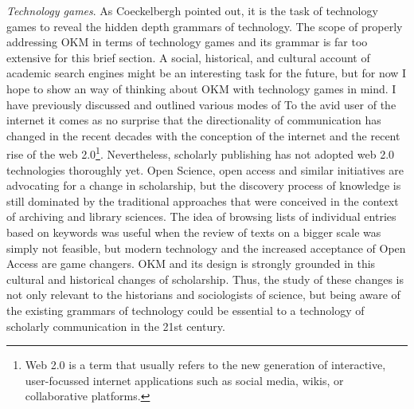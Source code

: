 \textit{Technology games}. As Coeckelbergh pointed out, it is the task of technology games to reveal the hidden depth grammars of technology. The scope of properly addressing OKM in terms of technology games and its grammar is far too extensive for this brief section. A social, historical, and cultural account of academic search engines might be an interesting task for the future, but for now I hope to show an way of thinking about OKM with technology games in mind. I have previously discussed and outlined various modes of  To the avid user of the internet it comes as no surprise that the directionality of communication has changed in the recent decades with the conception of the internet and the recent rise of the web 2.0\footnote{Web 2.0 is a term that usually refers to the new generation of interactive, user-focussed internet applications such as social media, wikis, or collaborative platforms.}. Nevertheless, scholarly publishing has not adopted web 2.0 technologies thoroughly yet. Open Science, open access and similar initiatives are advocating for a change in scholarship, but the discovery process of knowledge is still dominated by the traditional approaches that were conceived in the context of archiving and library sciences. The idea of browsing lists of individual entries based on keywords was useful when the review of texts on a bigger scale was simply not feasible, but modern technology and the increased acceptance of Open Access are game changers. OKM and its design is strongly grounded in this cultural and historical changes of scholarship. Thus, the study of these changes is not only relevant to the historians and sociologists of science, but being aware of the existing grammars of technology could be essential to a technology of scholarly communication in the 21st century.